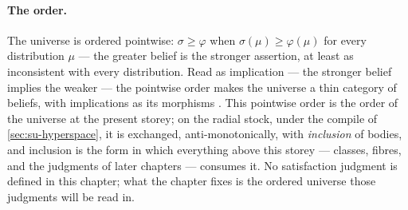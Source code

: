 \paragraph{The order.} The universe is ordered pointwise:
$\sigma \ge \varphi$ when $\sigma(\mu) \ge \varphi(\mu)$ for every
distribution $\mu$ --- the greater belief is the stronger assertion,
at least as inconsistent with every distribution. Read as
implication --- the stronger belief implies the weaker --- the
pointwise order makes the universe a thin category of beliefs, with
implications as its morphisms \cite{dalrymple26imprecise}. This pointwise
order is the order of the universe at the present storey; on the
radial stock, under the
compile of \autoref{sec:su-hyperspace}, it is exchanged,
anti-monotonically, with \emph{inclusion} of bodies, and inclusion
is the form in which everything above this storey --- classes,
fibres, and the judgments of later chapters --- consumes it. No
satisfaction judgment is defined in this chapter; what the chapter
fixes is the ordered universe those judgments will be read in.

